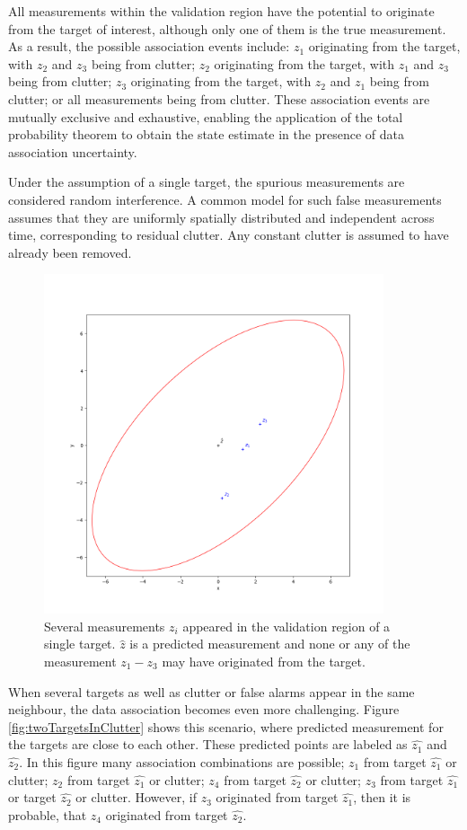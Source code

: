All measurements within the validation region have the potential to originate from the target of interest, although
only one of them is the true measurement. As a result, the possible association events include: $z_1$ originating
from the target, with $z_2$ and $z_3$ being from clutter; $z_2$ originating from the target, with $z_1$ and $z_3$
being from clutter; $z_3$ originating from the target, with $z_2$ and $z_1$ being from clutter; or all measurements
being from clutter. These association events are mutually exclusive and exhaustive, enabling the application of the
total probability theorem to obtain the state estimate in the presence of data association uncertainty.

Under the assumption of a single target, the spurious measurements are considered random interference. A common model for such false measurements assumes that they are uniformly spatially distributed and independent across time, corresponding to residual clutter. Any constant clutter is assumed to have already been removed.

\begin{figure}[h]
  \centering
  \includegraphics[width=10cm]{text/chapter_02/imgs/clutter_singleTarget}
  \caption{Several measurements $z_i$ appeared in the validation region of a single target. $\hat{z}$ is a predicted
  measurement and none or any of the measurement $z_1 - z_3$ may have originated from the target.}
  \label{fig:singleTargetInClutter}
\end{figure}

When several targets as well as clutter or false alarms appear in the same neighbour, the data association becomes
even more challenging. Figure \ref{fig:twoTargetsInClutter} shows this scenario, where predicted measurement for the
targets are close to each other. These predicted points are labeled as $\hat{z_1}$ and $\hat{z_2}$. In this figure
many association combinations are possible; $z_1$ from target $\hat{z_1}$ or clutter; $z_2$ from target $\hat{z_1}$
or clutter; $z_4$ from target $\hat{z_2}$ or clutter; $z_3$ from target $\hat{z_1}$ or target $\hat{z_2}$ or clutter. However, if $z_3$ originated from target $\hat{z_1}$, then it is probable, that $z_4$ originated from target $\hat{
    z_2}$.

